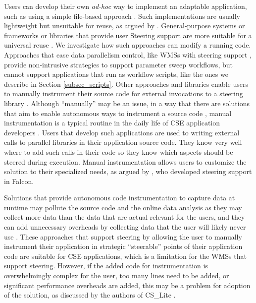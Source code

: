 Users can develop their own \textit{ad-hoc} way to implement
an adaptable application, such as using a simple file-based approach
\cite{Camata2018In}.
Such implementations are usually lightweight but unsuitable for reuse,
as argued by \citet{Bauer2016In}.
General-purpose systems or frameworks or libraries that provide
user Steering support are more suitable for a universal reuse
\cite{Bauer2016In}.
We investigate how such approaches can modify a running code.
Approaches that ease data parallelism control, like WMSs with steering support
\cite{Dias2015Data-centric,Nguyen2014WorkWays:,Souza2017Data},
provide non-intrusive strategies to support parameter sweep workflows, but cannot support applications that run as workflow scripts, like the ones we describe in Section \ref{subsec_scripts}.
Other approaches and libraries enable
users to manually instrument their source code for external invocations
to a steering library \cite{Ayachit2016Performance,Bauer2016In,MulderSurvey}.
Although ``manually'' may be an issue, in a way that there are solutions that aim to enable autonomous ways to instrument a source code
\cite{Pimentel2017noWorkflow:},
manual instrumentation is a typical routine in the daily life of CSE
application developers \cite{Bauer2016In,Silva2018Capturing}.
Users that develop such applications are used to writing external calls
to parallel libraries in their application source code. They know very
well where to add such calls in their code so they know which aspects
should be steered during execution. Manual instrumentation allows users
to customize the solution to their specialized needs, as argued by \citet{Gu1995Falcon:},
who developed steering support in Falcon.


Solutions that provide autonomous code instrumentation to
capture data at runtime may pollute the source code and the online data
analysis as they may collect more data than the data that are actual
relevant for the users, and they can add unnecessary overheads by
collecting data that the user will likely never use
\cite{Silva2018Capturing,Stamatogiannakis2016Trade-Offs}.
These approaches that support steering by allowing the user
to manually instrument their application in strategic ``steerable''
points of their application code are suitable for CSE applications,
which is a limitation for the WMSs that support steering. However, if
the added code for instrumentation is overwhelmingly complex for the
user, too many lines need to be added, or significant performance
overheads are added, this may be a problem for adoption of the solution,
as discussed by the authors of CS\_Lite
\cite{Figueira2004CS_LITE:}.



